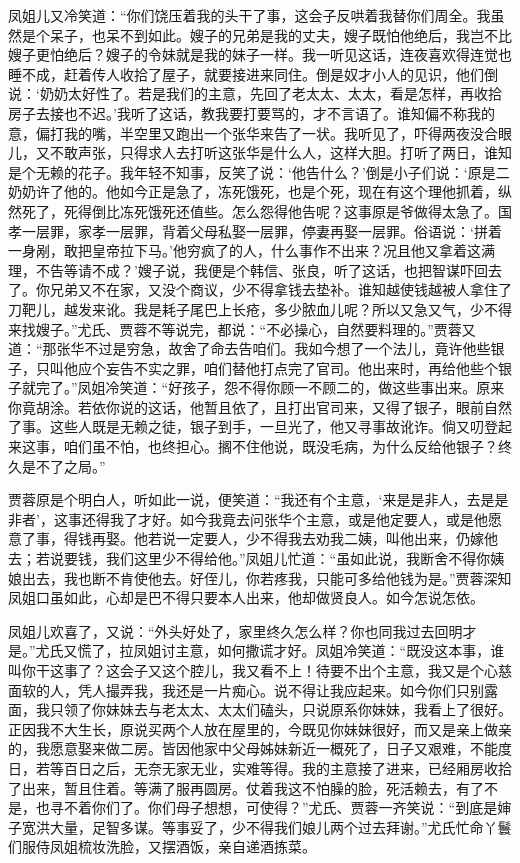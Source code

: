 \documentclass[12pt,oneside]{book}
\begin{document}
凤姐儿又冷笑道：“你们饶压着我的头干了事，这会子反哄着我替你们周全。我虽然是个呆子，也呆不到如此。嫂子的兄弟是我的丈夫，嫂子既怕他绝后，我岂不比嫂子更怕绝后？嫂子的令妹就是我的妹子一样。我一听见这话，连夜喜欢得连觉也睡不成，赶着传人收拾了屋子，就要接进来同住。倒是奴才小人的见识，他们倒说：‘奶奶太好性了。若是我们的主意，先回了老太太、太太，看是怎样，再收拾房子去接也不迟。’我听了这话，教我要打要骂的，才不言语了。谁知偏不称我的意，偏打我的嘴，半空里又跑出一个张华来告了一状。我听见了，吓得两夜没合眼儿，又不敢声张，只得求人去打听这张华是什么人，这样大胆。打听了两日，谁知是个无赖的花子。我年轻不知事，反笑了说：‘他告什么？’倒是小子们说：‘原是二奶奶许了他的。他如今正是急了，冻死饿死，也是个死，现在有这个理他抓着，纵然死了，死得倒比冻死饿死还值些。怎么怨得他告呢？这事原是爷做得太急了。国孝一层罪，家孝一层罪，背着父母私娶一层罪，停妻再娶一层罪。俗语说：‘拼着一身剐，敢把皇帝拉下马。’他穷疯了的人，什么事作不出来？况且他又拿着这满理，不告等请不成？’嫂子说，我便是个韩信、张良，听了这话，也把智谋吓回去了。你兄弟又不在家，又没个商议，少不得拿钱去垫补。谁知越使钱越被人拿住了刀靶儿，越发来讹。我是耗子尾巴上长疮，多少脓血儿呢？所以又急又气，少不得来找嫂子。”尤氏、贾蓉不等说完，都说：“不必操心，自然要料理的。”贾蓉又道：“那张华不过是穷急，故舍了命去告咱们。我如今想了一个法儿，竟许他些银子，只叫他应个妄告不实之罪，咱们替他打点完了官司。他出来时，再给他些个银子就完了。”凤姐冷笑道：“好孩子，怨不得你顾一不顾二的，做这些事出来。原来你竟胡涂。若依你说的这话，他暂且依了，且打出官司来，又得了银子，眼前自然了事。这些人既是无赖之徒，银子到手，一旦光了，他又寻事故讹诈。倘又叨登起来这事，咱们虽不怕，也终担心。搁不住他说，既没毛病，为什么反给他银子？终久是不了之局。”

贾蓉原是个明白人，听如此一说，便笑道：“我还有个主意，‘来是是非人，去是是非者’，这事还得我了才好。如今我竟去问张华个主意，或是他定要人，或是他愿意了事，得钱再娶。他若说一定要人，少不得我去劝我二姨，叫他出来，仍嫁他去；若说要钱，我们这里少不得给他。”凤姐儿忙道：“虽如此说，我断舍不得你姨娘出去，我也断不肯使他去。好侄儿，你若疼我，只能可多给他钱为是。”贾蓉深知凤姐口虽如此，心却是巴不得只要本人出来，他却做贤良人。如今怎说怎依。

凤姐儿欢喜了，又说：“外头好处了，家里终久怎么样？你也同我过去回明才是。”尤氏又慌了，拉凤姐讨主意，如何撒谎才好。凤姐冷笑道：“既没这本事，谁叫你干这事了？这会子又这个腔儿，我又看不上！待要不出个主意，我又是个心慈面软的人，凭人撮弄我，我还是一片痴心。说不得让我应起来。如今你们只别露面，我只领了你妹妹去与老太太、太太们磕头，只说原系你妹妹，我看上了很好。正因我不大生长，原说买两个人放在屋里的，今既见你妹妹很好，而又是亲上做亲的，我愿意娶来做二房。皆因他家中父母姊妹新近一概死了，日子又艰难，不能度日，若等百日之后，无奈无家无业，实难等得。我的主意接了进来，已经厢房收拾了出来，暂且住着。等满了服再圆房。仗着我这不怕臊的脸，死活赖去，有了不是，也寻不着你们了。你们母子想想，可使得？”尤氏、贾蓉一齐笑说：“到底是婶子宽洪大量，足智多谋。等事妥了，少不得我们娘儿两个过去拜谢。”尤氏忙命丫鬟们服侍凤姐梳妆洗脸，又摆酒饭，亲自递酒拣菜。
\end{document}
